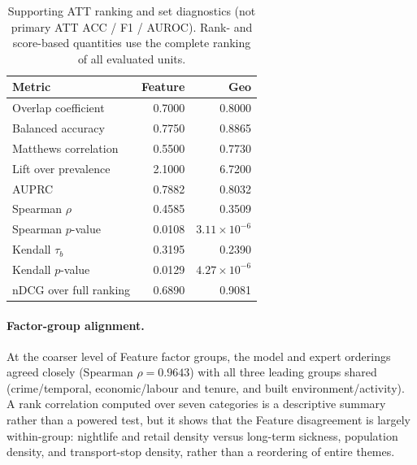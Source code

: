 \begin{table}[H]
\centering
\caption{Supporting ATT ranking and set diagnostics (not primary ATT ACC / F1 / AUROC).
Rank- and score-based quantities use the complete ranking of all evaluated units.}
\label{tab:hull_att_supporting}
\small
\begin{tabular}{lrr}
\toprule
Metric & Feature & Geo \\
\midrule
Overlap coefficient & 0.7000 & 0.8000 \\
Balanced accuracy & 0.7750 & 0.8865 \\
Matthews correlation & 0.5500 & 0.7730 \\
Lift over prevalence & 2.1000 & 6.7200 \\
AUPRC & 0.7882 & 0.8032 \\
Spearman $\rho$ & 0.4585 & 0.3509 \\
Spearman $p$-value & 0.0108 & $3.11\times10^{-6}$ \\
Kendall $\tau_b$ & 0.3195 & 0.2390 \\
Kendall $p$-value & 0.0129 & $4.27\times10^{-6}$ \\
nDCG over full ranking & 0.6890 & 0.9081 \\
\bottomrule
\end{tabular}
\end{table}

\paragraph{Factor-group alignment.}
At the coarser level of Feature factor groups, the model and expert orderings agreed closely (Spearman $\rho=0.9643$) with all three leading groups shared (crime/temporal, economic/labour and tenure, and built environment/activity). A rank correlation computed over seven categories is a descriptive summary rather than a powered test, but it shows that the Feature disagreement is largely within-group: nightlife and retail density versus long-term sickness, population density, and transport-stop density, rather than a reordering of entire themes.

